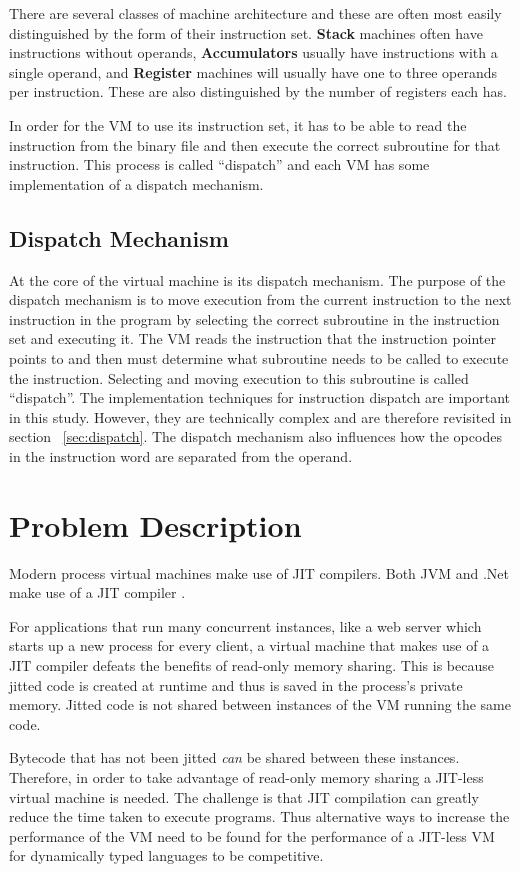 \documentclass[english,a4paper,12pt]{report}
\begin{document}
There are several classes of machine architecture and these are often
most easily distinguished by the form of their instruction
set. \textbf{Stack} machines often have instructions without operands,
\textbf{Accumulators} usually have instructions with a single operand,
and \textbf{Register} machines will usually have one to three operands
per instruction. These are also distinguished by the number of
registers each has.

In order for the VM to use its instruction set, it has to be able to
read the instruction from the binary file and then execute the correct
subroutine for that instruction. This process is called ``dispatch''
and each VM has some implementation of a dispatch mechanism.

\subsection{Dispatch Mechanism} 
At the core of the virtual machine is its dispatch mechanism. The
purpose of the dispatch mechanism is to move execution from the
current instruction to the next instruction in the program by
selecting the correct subroutine in the instruction set and executing
it. The VM reads the instruction that the instruction pointer points
to and then must determine what subroutine needs to be called to
execute the instruction. Selecting and moving execution to this
subroutine is called ``dispatch''. The implementation techniques for
instruction dispatch are important in this study. However, they are
technically complex and are therefore revisited in section
~\ref{sec:dispatch}. The dispatch mechanism also influences how the
opcodes in the instruction word are separated from the operand.

\section{Problem Description}
Modern process virtual machines make use of JIT compilers. Both JVM
and .Net make use of a JIT compiler \cite{MSDN,Oracle}. 

For applications that run many concurrent instances, like a web server
which starts up a new process for every client, a virtual machine that
makes use of a JIT compiler defeats the benefits of read-only memory
sharing. This is because jitted code is created at runtime and thus is
saved in the process's private memory. Jitted code is not shared
between instances of the VM running the same code.

Bytecode that has not been jitted \emph{can} be shared between these
instances. Therefore, in order to take advantage of read-only memory
sharing a JIT-less virtual machine is needed. The challenge is that
JIT compilation can greatly reduce the time taken to execute
programs. Thus alternative ways to increase the performance of the VM
need to be found for the performance of a JIT-less VM for dynamically
typed languages to be competitive.
\end{document}

